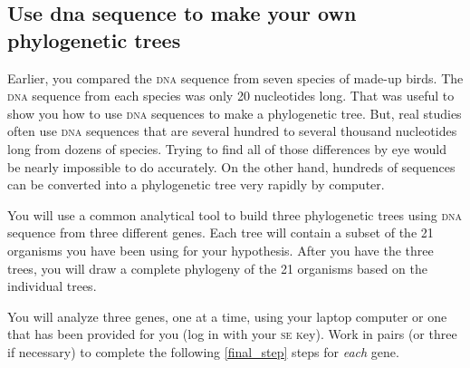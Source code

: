 \documentclass[12pt, hidelinks]{exam}
\newcommand{\dna}{\textsc{dna}}
\begin{document}
\subsection*{Use dna sequence to make your own phylogenetic trees}

Earlier, you compared the \dna{} sequence from seven species of made-up birds. 
The \dna{} sequence from each species was only 20 nucleotides long. That was useful
to show you how to use \dna{} sequences to make a phylogenetic tree. But, real studies
often use \dna{} sequences that are several hundred to several thousand nucleotides long
from dozens of species. Trying to find all of those differences by eye would be nearly impossible
to do accurately. On the other hand, hundreds of sequences can be converted into a phylogenetic tree very 
rapidly by computer. 

You will use a common analytical tool to build three phylogenetic trees using \dna{} sequence
from three different genes. Each tree will contain a subset of the 21 organisms you have been using for your hypothesis. After you have the three trees, you will draw a complete phylogeny of the 21 organisms based on the individual trees.

You will analyze three genes, one at a time, using your laptop computer or one that has been provided for you (log in with your \textsc{se k}ey).   Work in pairs (or three if necessary) to complete the following \ref{final_step} steps for \emph{each} gene.
\end{document}
